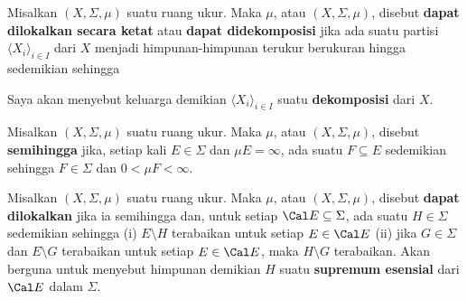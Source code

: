  Misalkan $(X,\Sigma,\mu)$ suatu ruang ukur.
Maka $\mu$, atau $(X,\Sigma,\mu)$, disebut {\bf dapat dilokalkan secara
ketat} atau {\bf dapat didekomposisi} jika ada suatu partisi
$\langle X_i\rangle_{i\in I}$ dari $X$ menjadi himpunan-himpunan
terukur berukuran hingga sedemikian sehingga
     
     
     
\noindent Saya akan menyebut keluarga demikian
$\langle X_i\rangle_{i\in I}$ suatu {\bf dekomposisi} dari $X$.
     
     
 Misalkan $(X,\Sigma,\mu)$ suatu ruang ukur.
Maka $\mu$, atau $(X,\Sigma,\mu)$, disebut {\bf semihingga} jika,
setiap kali $E\in\Sigma$ dan $\mu E=\infty$, ada suatu $F\subseteq E$
sedemikian sehingga $F\in\Sigma$ dan $0<\mu F<\infty$.
     
 Misalkan $(X,\Sigma,\mu)$ suatu ruang ukur.
Maka $\mu$, atau $(X,\Sigma,\mu)$, disebut {\bf dapat dilokalkan} jika
ia semihingga dan, untuk setiap $\Cal E\subseteq\Sigma$, ada suatu
$H\in\Sigma$ sedemikian sehingga (i) $E\setminus H$ terabaikan untuk
setiap $E\in\Cal E$ (ii) jika $G\in\Sigma$ dan $E\setminus G$
terabaikan untuk setiap $E\in\Cal E$, maka $H\setminus G$ terabaikan.
Akan berguna untuk menyebut himpunan demikian $H$ suatu {\bf supremum
esensial} dari $\Cal E$ dalam $\Sigma$.
     
     
